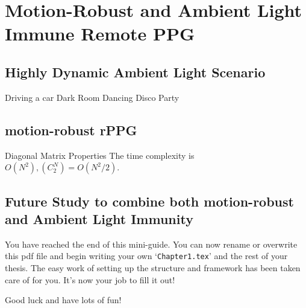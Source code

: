 \chapter{Motion-Robust and Ambient Light Immune Remote PPG} %

\label{Chapter7} %


\section{Highly Dynamic Ambient Light Scenario}
Driving a car
Dark Room
Dancing Disco Party

\section{motion-robust rPPG}

\begin{compactitem}

\item Diagonal Matrix Properties
The time complexity is $O(N^2),  (C_2^N) = O(N^2/2)$.
\end{compactitem}

\section{Future Study to combine both motion-robust and Ambient Light Immunity}

You have reached the end of this mini-guide. You can now rename or overwrite this pdf file and begin writing your own `\texttt{Chapter1.tex}' and the rest of your thesis. The easy work of setting up the structure and framework has been taken care of for you. It's now your job to fill it out!

Good luck and have lots of fun!
